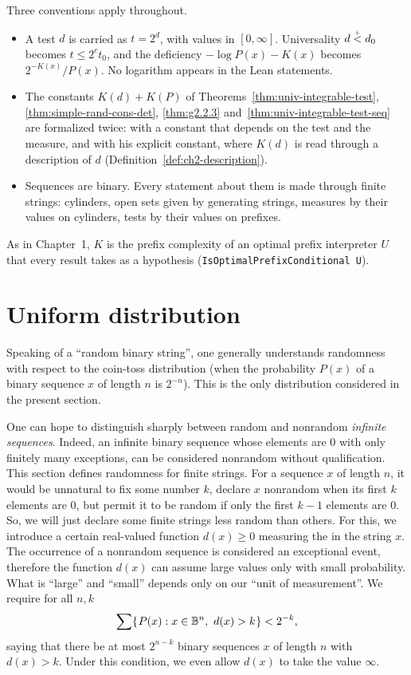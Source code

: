 Three conventions apply throughout.
\begin{itemize}
\item A test \( d \) is carried as \( t = 2^{d} \), with values in \( [0,\infty] \).
  Universality \( d \stackrel{{}_+}{<} d_{0} \) becomes \( t \le 2^{c} t_{0} \), and the deficiency
  \( -\log P(x) - K(x) \) becomes \( 2^{-K(x)}/P(x) \). No logarithm appears in the Lean
  statements.
\item The constants \( K(d) + K(P) \) of Theorems~\ref{thm:univ-integrable-test},
  \ref{thm:simple-rand-cons-det}, \ref{thm:g2.2.3} and~\ref{thm:univ-integrable-test-seq}
  are formalized twice: with a constant that depends on the test and the measure, and with
  his explicit constant, where \( K(d) \) is read through a description of \( d \)
  (Definition~\ref{def:ch2-description}).
\item Sequences are binary. Every statement about them is made through finite strings:
  cylinders, open sets given by generating strings, measures by their values on cylinders,
  tests by their values on prefixes.
\end{itemize}
As in Chapter~1, \( K \) is the prefix complexity of an optimal prefix interpreter \( U \)
that every result takes as a hypothesis (\texttt{IsOptimalPrefixConditional U}).

\section{Uniform distribution} \label{sec:tests}

Speaking of a ``random binary string'', one generally understands
randomness with respect to the coin-toss distribution (when the
probability $P(x)$ of a binary sequence $x$ of length $n$ is $2^{-n}$).
This is the only distribution considered in the present section.

One can hope to distinguish sharply between random and nonrandom
\emph{infinite sequences}.
Indeed, an infinite binary sequence whose
elements are 0 with only finitely many exceptions, can be considered
nonrandom without qualification.
This section defines randomness for finite strings.
For a sequence $x$ of length $n$, it would be
unnatural to fix some number $k$, declare $x$ nonrandom when its
first $k$ elements are 0, but permit it to be random if only the
first $k-1$ elements are 0.
So, we will just declare some finite strings less random than others.
For
this, we introduce a certain real-valued function $d(x) \ge 0$ measuring
the  in the string $x$.
The occurrence
of a nonrandom sequence is considered an  exceptional event,
therefore the function $d(x)$ can assume large values only with small
probability.
What is ``large'' and ``small'' depends only on our ``unit of measurement''.
We require for all $n,k$
 \begin{equation} \label{eq:testcond}
\sum\mathopen\{\mskip 1mu P(x): x\in \mathbb{B}^{n},\ d(x) > k \mskip 1mu\mathclose\} < 2^{-k},
 \end{equation}
saying that there be at most $2^{n-k}$ binary sequences $x$ of length
$n$ with $d(x)>k$.
Under this condition, we even allow $d(x)$ to take the value $\infty$.

